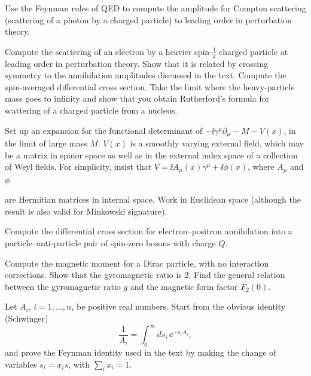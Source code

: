 \begin{banksproblems}

Use the Feynman rules of QED to compute the amplitude for Compton scattering
(scattering of a photon by a charged particle) to leading order in perturbation
theory.

Compute the scattering of an electron by a heavier spin-$\frac12$ charged particle at
leading order in perturbation theory. Show that it is related by crossing symmetry
to the annihilation amplitudes discussed in the text. Compute the spin-averaged
differential cross section. Take the limit where the heavy-particle mass goes to
infinity and show that you obtain Rutherford's formula for scattering of a charged
particle from a nucleus.

Set up an expansion for the functional determinant of $-\ii\gamma^\mu\partial_\mu-M-V(x)$, in
the limit of large mass $M$. $V(x)$ is a smoothly varying external field, which may
be a matrix in spinor space as well as in the external index space of a collection
of Weyl fields. For simplicity, insist that $V=\ii A_\mu(x)\gamma^\mu+\ii\phi(x)$, where $A_\mu$ and $\phi$

are Hermitian matrices in internal space. Work in Euclidean space (although the
result is also valid for Minkowski signature).

Compute the differential cross section for electron--positron annihilation into a
particle--anti-particle pair of spin-zero bosons with charge $Q$.

Compute the magnetic moment for a Dirac particle, with no interaction corrections.
Show that the gyromagnetic ratio is 2. Find the general relation between the
gyromagnetic ratio $g$ and the magnetic form factor $F_2(0)$.

Let $A_i$, $i=1,\ldots,n$, be positive real numbers. Start from the obvious identity
(Schwinger)
\begin{equation*}
  \frac1{A_i}=\int_0^\infty ds_i\,\ee^{-s_iA_i},
\end{equation*}
and prove the Feynman identity used in the text by making the change of variables
$s_i=x_i s$, with $\sum_i x_i=1$.


\end{banksproblems}
